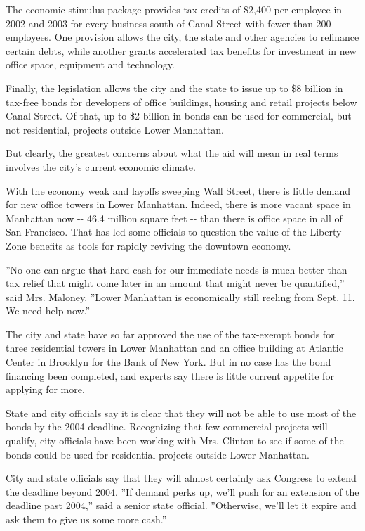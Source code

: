 The economic stimulus package provides tax credits of \$2,400 per
employee in 2002 and 2003 for every business south of Canal Street with
fewer than 200 employees. One provision allows the city, the state and
other agencies to refinance certain debts, while another grants
accelerated tax benefits for investment in new office space, equipment
and technology.

Finally, the legislation allows the city and the state to issue up to
\$8 billion in tax-free bonds for developers of office buildings,
housing and retail projects below Canal Street. Of that, up to \$2
billion in bonds can be used for commercial, but not residential,
projects outside Lower Manhattan.

But clearly, the greatest concerns about what the aid will mean in real
terms involves the city's current economic climate.

With the economy weak and layoffs sweeping Wall Street, there is little
demand for new office towers in Lower Manhattan. Indeed, there is more
vacant space in Manhattan now -\/- 46.4 million square feet -\/- than
there is office space in all of San Francisco. That has led some
officials to question the value of the Liberty Zone benefits as tools
for rapidly reviving the downtown economy.

''No one can argue that hard cash for our immediate needs is much better
than tax relief that might come later in an amount that might never be
quantified,'' said Mrs. Maloney. ''Lower Manhattan is economically still
reeling from Sept. 11. We need help now.''

The city and state have so far approved the use of the tax-exempt bonds
for three residential towers in Lower Manhattan and an office building
at Atlantic Center in Brooklyn for the Bank of New York. But in no case
has the bond financing been completed, and experts say there is little
current appetite for applying for more.

State and city officials say it is clear that they will not be able to
use most of the bonds by the 2004 deadline. Recognizing that few
commercial projects will qualify, city officials have been working with
Mrs. Clinton to see if some of the bonds could be used for residential
projects outside Lower Manhattan.

City and state officials say that they will almost certainly ask
Congress to extend the deadline beyond 2004. ''If demand perks up, we'll
push for an extension of the deadline past 2004,'' said a senior state
official. ''Otherwise, we'll let it expire and ask them to give us some
more cash.''

